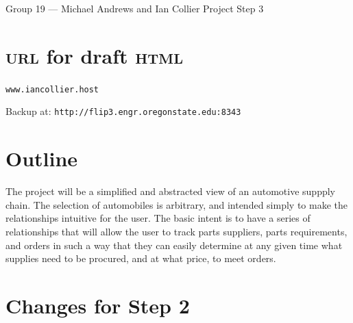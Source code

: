 \documentclass[11pt,letterpaper,oneside]{amsart}
\begin{document}
Group 19 --- Michael Andrews and Ian Collier
Project Step 3

\section*{\textsc{url} for draft \textsc{html}}

\texttt{www.iancollier.host}

Backup at: \texttt{http://flip3.engr.oregonstate.edu:8343}

\section*{Outline}

The project will be a simplified and abstracted view of an automotive suppply chain.  The selection of automobiles is arbitrary, and intended simply to make the relationships intuitive for the user.  The basic intent is to have a series of relationships that will allow the user to track parts suppliers, parts requirements, and orders in such a way that they can easily determine at any given time what supplies need to be procured, and at what price, to meet orders.

\section*{Changes for Step 2}
\end{document}
